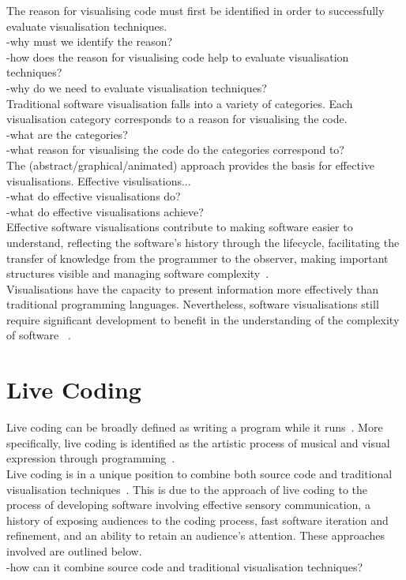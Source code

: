 The reason for visualising code must first be identified in order to successfully evaluate visualisation techniques.\\
-why must we identify the reason?\\
-how does the reason for visualising code help to evaluate visualisation techniques?\\
-why do we need to evaluate visualisation techniques?\\

Traditional software visualisation falls into a variety of categories. Each visualisation category corresponds to a reason for visualising the code.\\
-what are the categories?\\
-what reason for visualising the code do the categories correspond to?\\

The (abstract/graphical/animated) approach provides the basis for effective visualisations. Effective visulisations...\\
-what do effective visualisations do?\\
-what do effective visualisations achieve?\\
Effective software visualisations contribute to making software easier to understand, reflecting the software's history through the lifecycle, facilitating the transfer of knowledge from the programmer to the observer, making important structures visible and managing software complexity~\cite{Baecker1995}.\\

Visualisations have the capacity to present information more effectively than traditional programming languages. Nevertheless, software visualisations still require significant development to benefit in the understanding of the complexity of software ~\cite{Baecker1995}.\\

\section{Live Coding}

Live coding can be broadly defined as writing a program while it runs~\cite{Ward2004}. More specifically, live coding is identified as the artistic process of musical and visual expression through programming~\cite{Collins2003}.\\

Live coding is in a unique position to combine both source code and traditional visualisation techniques~\cite{McLean2010a}. This is due to the approach of live coding to the process of developing software involving effective sensory communication, a history of exposing audiences to the coding process, fast software iteration and refinement, and an ability to retain an audience's attention. These approaches involved are outlined below.\\
-how can it combine source code and traditional visualisation techniques?\\

